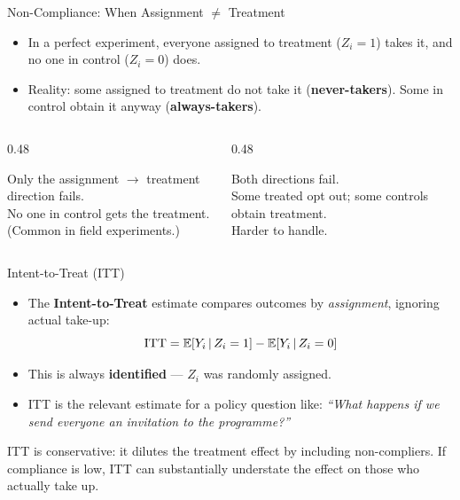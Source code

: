 \documentclass[aspectratio=169, 11pt]{beamer}
\begin{document}

\begin{frame}[t]{Non-Compliance: When Assignment $\neq$ Treatment}
\begin{itemize}
  \setlength\itemsep{0.5em}
  \item In a perfect experiment, everyone assigned to treatment ($Z_i = 1$) takes it,
        and no one in control ($Z_i = 0$) does.
  \item Reality: some assigned to treatment do not take it (\textbf{never-takers}).
        Some in control obtain it anyway (\textbf{always-takers}).
\end{itemize}
\vspace{0.3em}
\begin{columns}[T]
\begin{column}{0.48\textwidth}
  \begin{keybox}
    Only the assignment $\to$ treatment direction fails.\\
    No one in control gets the treatment.\\
    (Common in field experiments.)
  \end{keybox}
\end{column}
\begin{column}{0.48\textwidth}
  \begin{warningbox}
    Both directions fail.\\
    Some treated opt out; some controls obtain treatment.\\
    Harder to handle.
  \end{warningbox}
\end{column}
\end{columns}
\end{frame}

\begin{frame}[t]{Intent-to-Treat (ITT)}
\begin{itemize}
  \setlength\itemsep{0.5em}
  \item The \textbf{Intent-to-Treat} estimate compares outcomes by \emph{assignment},
        ignoring actual take-up:
  \[
    \mathrm{ITT} = \mathbb{E}\!\left[Y_i\,\middle|\,Z_i=1\right] - \mathbb{E}\!\left[Y_i\,\middle|\,Z_i=0\right]
  \]
  \item This is always \textbf{identified} — $Z_i$ was randomly assigned.
  \item ITT is the relevant estimate for a policy question like:
    \emph{``What happens if we send everyone an invitation to the programme?''}
\end{itemize}
\vspace{0.3em}
\begin{intuitionbox}
ITT is conservative: it dilutes the treatment effect by including
non-compliers. If compliance is low, ITT can substantially understate
the effect on those who actually take up.
\end{intuitionbox}
\end{frame}
\end{document}
